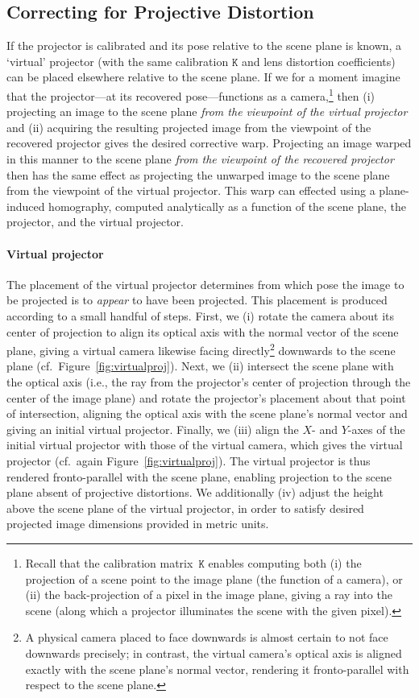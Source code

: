 \documentclass[review]{elsarticle}
\begin{document}
\subsection{Correcting for Projective Distortion}\label{sec:approach:homography}

If the projector is calibrated and its pose relative to the scene plane is known, a `virtual' projector (with the same calibration $\mathtt{K}$ and lens distortion coefficients) can be placed elsewhere relative to the scene plane. If we for a moment imagine that the projector---at its recovered pose---functions as a camera,\footnote{Recall that the calibration matrix~$\mathtt{K}$ enables computing both (i) the projection of a scene point to the image plane (the function of a camera), or (ii) the back-projection of a pixel in the image plane, giving a ray into the scene (along which a projector illuminates the scene with the given pixel).} then (i) projecting an image to the scene plane \textit{from the viewpoint of the virtual projector} and (ii) acquiring the resulting projected image from the viewpoint of the recovered projector gives the desired corrective warp. Projecting an image warped in this manner to the scene plane \textit{from the viewpoint of the recovered projector} then has the same effect as projecting the unwarped image to the scene plane from the viewpoint of the virtual projector. This warp can effected using a plane-induced homography, computed analytically as a function of the scene plane, the projector, and the virtual projector.

\paragraph{Virtual projector} The placement of the virtual projector determines from which pose the image to be projected is to \textit{appear} to have been projected. This placement is produced according to a small handful of steps. First, we (i) rotate the camera about its center of projection to align its optical axis with the normal vector of the scene plane, giving a virtual camera likewise facing directly\footnote{A physical camera placed to face downwards is almost certain to not face downwards precisely; in contrast, the virtual camera's optical axis is aligned exactly with the scene plane's normal vector, rendering it fronto-parallel with respect to the scene plane.} downwards to the scene plane (cf.\ Figure~\ref{fig:virtualproj}). Next, we (ii) intersect the scene plane with the optical axis (i.e., the ray from the projector's center of projection through the center of the image plane) and rotate the projector's placement about that point of intersection, aligning the optical axis with the scene plane's normal vector and giving an initial virtual projector. Finally, we (iii) align the $X$- and $Y$-axes of the initial virtual projector with those of the virtual camera, which gives the virtual projector (cf.\ again Figure~\ref{fig:virtualproj}). The virtual projector is thus rendered fronto-parallel with the scene plane, enabling projection to the scene plane absent of projective distortions. We additionally (iv) adjust the height above the scene plane of the virtual projector, in order to satisfy desired projected image dimensions provided in metric units.
\end{document}
